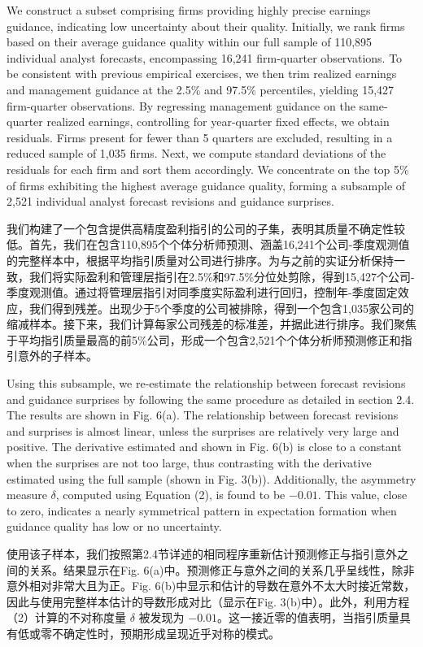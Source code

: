 \documentclass[12pt,a4paper]{article}
\newenvironment{original}
  {\par\medskip\noindent\ignorespaces}
  {\par\medskip}
\newenvironment{translation}
  {\par\noindent{\color{transblue}\ignorespaces}}
  {\par\bigskip}
\begin{document}
\begin{original}
We construct a subset comprising firms providing highly precise earnings guidance, indicating low uncertainty about their quality. Initially, we rank firms based on their average guidance quality within our full sample of 110,895 individual analyst forecasts, encompassing 16,241 firm-quarter observations. To be consistent with previous empirical exercises, we then trim realized earnings and management guidance at the 2.5\% and 97.5\% percentiles, yielding 15,427 firm-quarter observations. By regressing management guidance on the same-quarter realized earnings, controlling for year-quarter fixed effects, we obtain residuals. Firms present for fewer than 5 quarters are excluded, resulting in a reduced sample of 1,035 firms. Next, we compute standard deviations of the residuals for each firm and sort them accordingly. We concentrate on the top 5\% of firms exhibiting the highest average guidance quality, forming a subsample of 2,521 individual analyst forecast revisions and guidance surprises.
\end{original}
\begin{translation}
我们构建了一个包含提供高精度盈利指引的公司的子集，表明其质量不确定性较低。首先，我们在包含110,895个个体分析师预测、涵盖16,241个公司-季度观测值的完整样本中，根据平均指引质量对公司进行排序。为与之前的实证分析保持一致，我们将实际盈利和管理层指引在2.5\%和97.5\%分位处剪除，得到15,427个公司-季度观测值。通过将管理层指引对同季度实际盈利进行回归，控制年-季度固定效应，我们得到残差。出现少于5个季度的公司被排除，得到一个包含1,035家公司的缩减样本。接下来，我们计算每家公司残差的标准差，并据此进行排序。我们聚焦于平均指引质量最高的前5\%公司，形成一个包含2,521个个体分析师预测修正和指引意外的子样本。
\end{translation}

\begin{original}
Using this subsample, we re-estimate the relationship between forecast revisions and guidance surprises by following the same procedure as detailed in section 2.4. The results are shown in Fig. 6(a). The relationship between forecast revisions and surprises is almost linear, unless the surprises are relatively very large and positive. The derivative estimated and shown in Fig. 6(b) is close to a constant when the surprises are not too large, thus contrasting with the derivative estimated using the full sample (shown in Fig. 3(b)). Additionally, the asymmetry measure $\delta$, computed using Equation (2), is found to be $-0.01$. This value, close to zero, indicates a nearly symmetrical pattern in expectation formation when guidance quality has low or no uncertainty.
\end{original}
\begin{translation}
使用该子样本，我们按照第2.4节详述的相同程序重新估计预测修正与指引意外之间的关系。结果显示在Fig. 6(a)中。预测修正与意外之间的关系几乎呈线性，除非意外相对非常大且为正。Fig. 6(b)中显示和估计的导数在意外不太大时接近常数，因此与使用完整样本估计的导数形成对比（显示在Fig. 3(b)中）。此外，利用方程（2）计算的不对称度量 $\delta$ 被发现为 $-0.01$。这一接近零的值表明，当指引质量具有低或零不确定性时，预期形成呈现近乎对称的模式。
\end{translation}
\end{document}
